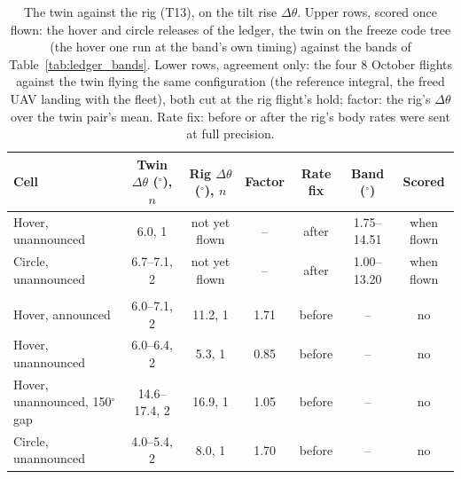 \begin{table}[htbp]
  \centering
  \footnotesize
  \caption[The twin against the rig]{The twin against the rig (T13), on the tilt rise $\Delta\theta$. Upper rows,
  scored once flown: the hover and circle releases of the ledger, the twin on the freeze code tree (the hover one run
  at the band's own timing) against the bands of Table~\ref{tab:ledger_bands}. Lower rows, agreement only: the four
  8 October flights against the twin flying the same configuration (the reference integral, the freed UAV landing with
  the fleet), both cut at the rig flight's hold; factor: the rig's $\Delta\theta$ over the twin pair's mean. Rate fix:
  before or after the rig's body rates were sent at full precision.}
  \label{tab:T13}
  \begin{tabularx}{\textwidth}{>{\raggedright\arraybackslash}Xcccccc}
    \toprule
    Cell & Twin $\Delta\theta$ ($^\circ$), $n$ & Rig $\Delta\theta$ ($^\circ$), $n$ & Factor & Rate fix & Band ($^\circ$) & Scored \\
    \midrule
    Hover, unannounced & 6.0, 1 & not yet flown & -- & after & 1.75--14.51 & when flown \\
    Circle, unannounced & 6.7--7.1, 2 & not yet flown & -- & after & 1.00--13.20 & when flown \\
    \midrule
    \multicolumn{7}{l}{\emph{8 October pairs (agreement, not scored)}} \\
    Hover, announced & 6.0--7.1, 2 & 11.2, 1 & 1.71 & before & -- & no \\
    Hover, unannounced & 6.0--6.4, 2 & 5.3, 1 & 0.85 & before & -- & no \\
    Hover, unannounced, 150$^\circ$ gap & 14.6--17.4, 2 & 16.9, 1 & 1.05 & before & -- & no \\
    Circle, unannounced & 4.0--5.4, 2 & 8.0, 1 & 1.70 & before & -- & no \\
    \bottomrule
  \end{tabularx}
\end{table}
